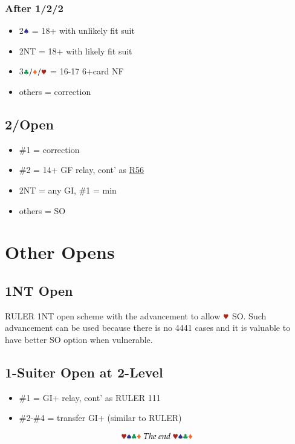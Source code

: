 \documentclass{article}
\begin{document}
\begin{multicols}{2}
\subsubsection{After 1\CCC/2\DDD/2\HHH}\label{sec:1s-escape}
\begin{itemize}
    \item 2$\sss$ = 18+ with unlikely fit suit
    \item 2NT = 18+ with likely fit suit
    \item 3$\ccc/\ddd/\hhh$ = 16-17 6+card NF
    \item others = correction
\end{itemize}

\subsection{2\CCC/\DDD Open}\label{sec:2cd}
\begin{itemize}
    \item \#1 = correction
    \item \#2 = 14+ GF relay, cont' as \hyperref[sec:nlm3r56]{R56}
    \item 2NT = any GI, \#1 = min
    \item others = SO
\end{itemize}

\section{Other Opens}
\subsection{1NT Open}\label{sec:1n}
RULER 1NT open scheme with the advancement to allow $\hhh$ SO. Such advancement can be used because there is no 4441 cases and it is valuable to have better SO option when vulnerable.

\subsection{1-Suiter Open at 2-Level}\label{sec:1suit}
\begin{itemize}
    \item \#1 = GI+ relay, cont' as RULER 111
    \item \#2-\#4 = transfer GI+ (similar to RULER)
\end{itemize}

$$\hhh\sss\ccc\ddd~The~end~\hhh\sss\ccc\ddd$$

\end{multicols}
\end{document}

